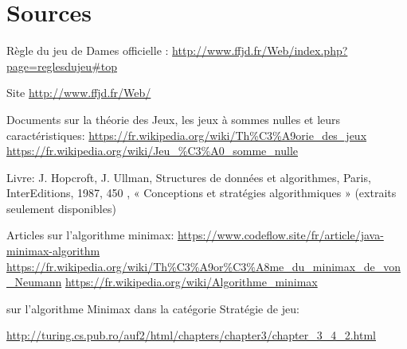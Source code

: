 \documentclass[12,french]{report}
\begin{document}
\listofalgorithms
\listoffigures

\chapter*{Sources}

Règle du jeu de Dames officielle : \url{http://www.ffjd.fr/Web/index.php?page=reglesdujeu#top}

Site 
\url{http://www.ffjd.fr/Web/}

Documents sur la théorie des Jeux, les jeux à sommes nulles et leurs caractéristiques:
\url {https://fr.wikipedia.org/wiki/Th%C3%A9orie_des_jeux}
\url {https://fr.wikipedia.org/wiki/Jeu_%C3%A0_somme_nulle}
	
Livre:
 J. Hopcroft, J. Ullman, Structures de données et algorithmes, Paris, InterEditions, 1987, 450 , « Conceptions et stratégies algorithmiques » (extraits seulement disponibles)
 
Articles sur l'algorithme minimax:
\url {https://www.codeflow.site/fr/article/java-minimax-algorithm}
\url {https://fr.wikipedia.org/wiki/Th%C3%A9or%C3%A8me_du_minimax_de_von_Neumann}
\url {https://fr.wikipedia.org/wiki/Algorithme_minimax}

sur l'algorithme Minimax dans la catégorie Stratégie de jeu:

\url {http://turing.cs.pub.ro/auf2/html/chapters/chapter3/chapter_3_4_2.html}
\end{document}

